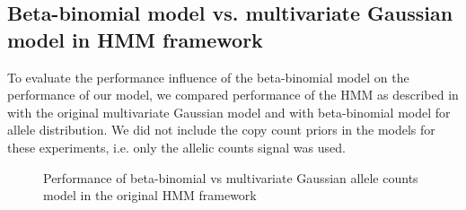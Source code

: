 \subsection{Beta-binomial model vs. multivariate Gaussian model in HMM framework}
To evaluate the performance influence of the beta-binomial model on the performance of our model, we compared performance of the HMM as described in \cite{rampasek2014fcnv} with the original multivariate Gaussian model and with beta-binomial model for allele distribution. We did not include the copy count priors in the models for these experiments, i.e. only the allelic counts signal was used.

\begin{figure}
\caption{Performance of beta-binomial vs multivariate Gaussian allele counts model in the original HMM framework}
\label{fig:BBvsMG}
\centering
\end{figure}


%
%
%
%
%


